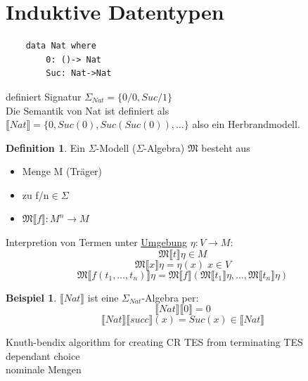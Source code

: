 \documentclass{article}
\theoremstyle{definition}
\newtheorem{beispiel}{Beispiel}[section]
\newtheorem{definition}{Definition}[section]
\begin{document}
	\section{Induktive Datentypen}
	\begin{verbatim}
	data Nat where
		0: ()-> Nat
		Suc: Nat->Nat
	\end{verbatim}
	definiert Signatur $\Sigma_{Nat} = \{0/0,Suc/1\}$\\
	Die Semantik von Nat ist definiert als\\
	$\llbracket Nat\rrbracket=\{0,Suc(0),Suc(Suc(0)),\dots\}$ also ein Herbrandmodell.\\
	\begin{definition} Ein $\Sigma$-Modell ($\Sigma$-Algebra) $\mathfrak{M}$ besteht aus\\
	\begin{itemize}
		\item Menge M (Träger)
		\item zu f/n$\in\Sigma$
		\item $\mathfrak{M}\llbracket f\rrbracket:M^n\to M$
	\end{itemize}
	Interpretion von Termen unter \underline{Umgebung} $\eta:V\to M:$\\
	\[\mathfrak{M}\llbracket t\rrbracket\eta \in M\]
	\[\mathfrak{M}\llbracket x\rrbracket\eta= \eta(x)\; x\in V\]
	\[\mathfrak{M}\llbracket f(t_1,\dots,t_n)\rrbracket\eta= \mathfrak{M}\llbracket f\rrbracket(\mathfrak{M}\llbracket t_1\rrbracket\eta,\dots,\mathfrak{M}\llbracket t_n\rrbracket\eta)\]
	\end{definition}
	\newcommand{\dbrack}[1]{\llbracket #1\rrbracket}
	\begin{beispiel} $\dbrack{Nat}$ ist eine $\Sigma_{Nat}$-Algebra per:\\
	\[\dbrack{Nat}\dbrack{0} = 0\]
	\[\dbrack{Nat}\dbrack{succ}(x) = Suc(x)\in\dbrack{Nat}\]
	\end{beispiel}










	\newpage
	\begin{thebibliography}{1}
	Knuth-bendix algorithm for creating CR TES from terminating TES\\
	dependant choice\\
	nominale Mengen\\

	\end{thebibliography}
\end{document}
